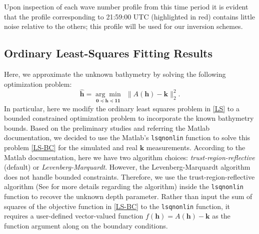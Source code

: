 Upon inspection of each wave number profile from this time period it is evident that the profile corresponding to 21:59:00 UTC (highlighted in red) contains little noise relative to the others; this profile will be used for our inversion schemes.


\subsection{Ordinary Least-Squares Fitting Results} \label{OrdLstSqrRes}
Here, we approximate the unknown bathymetry by solving the following optimization problem:
\begin{equation}\label{LS-BC}
\mathbf{\hat{h}}= \underset{\mathbf{0} \preceq \mathbf{h} \preceq \mathbf{11} }{\arg \min} \ \  \|  A(\mathbf{h}) -  \mathbf{k} \|_2^2.
\end{equation}
In particular, here we modify the ordinary least squares problem in \eqref{LS} to a bounded constrained optimization problem to incorporate the known bathymetry bounds. Based on the preliminary studies and referring the Matlab documentation, we decided to use the Matlab's \verb|lsqnonlin| function to solve this problem \eqref{LS-BC} for the simulated and real $\mathbf{k}$ measurements. According to the Matlab documentation, here we have two algorithm choices: \textit{trust-region-reflective} (default) or \textit{Levenberg-Marquardt}. However, the Levenberg-Marquardt algorithm does not handle bounded constraints. Therefore, we use the trust-region-reflective algorithm (See \cite{trustregion} for more details regarding the algorithm) inside the \verb|lsqnonlin| function to recover the unknown depth parameter. Rather than input the sum of squares of the objective function in \eqref{LS-BC} to the \verb|lsqnonlin| function, it requires a user-defined vector-valued function $f(\mathbf{h}) = A(\mathbf{h}) -  \mathbf{k}$ as the function argument along on the boundary conditions. 

